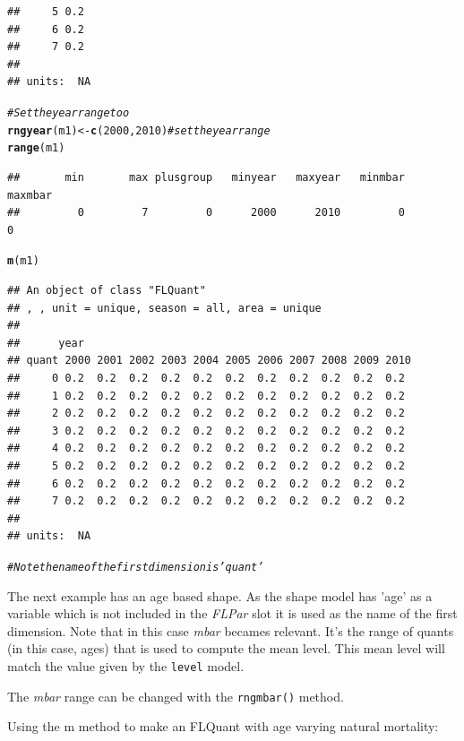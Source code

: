 \documentclass[a4paper,english,10pt]{article}\usepackage[]{graphicx}\usepackage[]{color}
\makeatletter
\newcommand{\hlnum}[1]{\textcolor[rgb]{0.686,0.059,0.569}{#1}}%
\newcommand{\hlcom}[1]{\textcolor[rgb]{0.678,0.584,0.686}{\textit{#1}}}%
\newcommand{\hlstd}[1]{\textcolor[rgb]{0.345,0.345,0.345}{#1}}%
\newcommand{\hlkwb}[1]{\textcolor[rgb]{0.69,0.353,0.396}{#1}}%
\newcommand{\hlkwd}[1]{\textcolor[rgb]{0.737,0.353,0.396}{\textbf{#1}}}%
\newenvironment{kframe}{%
 \def\at@end@of@kframe{}%
 \ifinner\ifhmode%
  \def\at@end@of@kframe{\end{minipage}}%
  \begin{minipage}{\columnwidth}%
 \fi\fi%
 \def\FrameCommand##1{\hskip\@totalleftmargin \hskip-\fboxsep
 \colorbox{shadecolor}{##1}\hskip-\fboxsep
     \hskip-\linewidth \hskip-\@totalleftmargin \hskip\columnwidth}%
 \MakeFramed {\advance\hsize-\width
   \@totalleftmargin\z@ \linewidth\hsize
   \@setminipage}}%
 {\par\unskip\endMakeFramed%
 \at@end@of@kframe}
\newenvironment{knitrout}{}{} %
\newcommand{\code}[1]{{\texttt{#1}}}
\newcommand{\class}[1]{{\textit{#1}}}
\makeatother
\begin{document}
\begin{knitrout}
\begin{kframe}
\begin{verbatim}
##     5 0.2
##     6 0.2
##     7 0.2
## 
## units:  NA
\end{verbatim}
\begin{alltt}
\hlcom{# Set the year range too}
\hlkwd{rngyear}\hlstd{(m1)} \hlkwb{<-} \hlkwd{c}\hlstd{(}\hlnum{2000}\hlstd{,} \hlnum{2010}\hlstd{)}  \hlcom{# set the year range}
\hlkwd{range}\hlstd{(m1)}
\end{alltt}
\begin{verbatim}
##       min       max plusgroup   minyear   maxyear   minmbar   maxmbar 
##         0         7         0      2000      2010         0         0
\end{verbatim}
\begin{alltt}
\hlkwd{m}\hlstd{(m1)}
\end{alltt}
\begin{verbatim}
## An object of class "FLQuant"
## , , unit = unique, season = all, area = unique
## 
##      year
## quant 2000 2001 2002 2003 2004 2005 2006 2007 2008 2009 2010
##     0 0.2  0.2  0.2  0.2  0.2  0.2  0.2  0.2  0.2  0.2  0.2 
##     1 0.2  0.2  0.2  0.2  0.2  0.2  0.2  0.2  0.2  0.2  0.2 
##     2 0.2  0.2  0.2  0.2  0.2  0.2  0.2  0.2  0.2  0.2  0.2 
##     3 0.2  0.2  0.2  0.2  0.2  0.2  0.2  0.2  0.2  0.2  0.2 
##     4 0.2  0.2  0.2  0.2  0.2  0.2  0.2  0.2  0.2  0.2  0.2 
##     5 0.2  0.2  0.2  0.2  0.2  0.2  0.2  0.2  0.2  0.2  0.2 
##     6 0.2  0.2  0.2  0.2  0.2  0.2  0.2  0.2  0.2  0.2  0.2 
##     7 0.2  0.2  0.2  0.2  0.2  0.2  0.2  0.2  0.2  0.2  0.2 
## 
## units:  NA
\end{verbatim}
\begin{alltt}
\hlcom{# Note the name of the first dimension is 'quant'}
\end{alltt}
\end{kframe}
\end{knitrout}


The next example has an age based shape. As the shape model has 'age' as a variable which is not included in the \class{FLPar} slot it is used as the name of the first dimension. Note that in this case \emph{mbar} becames relevant. It's the range of quants (in this case, ages) that is used to compute the mean level. This mean level will match the value given by the \code{level} model.

The \emph{mbar} range can be changed with the \code{rngmbar()} method.

Using the m method to make an FLQuant with age varying natural mortality:
\end{document}
